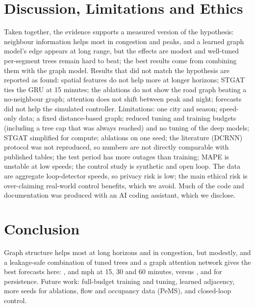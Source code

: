 \documentclass[conference]{IEEEtran}
\begin{document}
\section{Discussion, Limitations and Ethics}
Taken together, the evidence supports a measured version of the hypothesis: neighbour information helps most in congestion and peaks, and a learned graph model's edge appears at long range, but the effects are modest and well-tuned per-segment trees remain hard to beat; the best results come from combining them with the graph model.
Results that did not match the hypothesis are reported as found: spatial features do not help more at longer horizons; STGAT ties the GRU at 15 minutes; the ablations do not show the road graph beating a no-neighbour graph; attention does not shift between peak and night; forecasts did not help the simulated controller.
Limitations: one city and season; speed-only data; a fixed distance-based graph; reduced tuning and training budgets (including a tree cap that was always reached) and no tuning of the deep models; STGAT simplified for compute; ablations on one seed; the literature (DCRNN) protocol was not reproduced, so numbers are not directly comparable with published tables; the test period has more outages than training; MAPE is unstable at low speeds; the control study is synthetic and open loop.
The data are aggregate loop-detector speeds, so privacy risk is low; the main ethical risk is over-claiming real-world control benefits, which we avoid.
Much of the code and documentation was produced with an AI coding assistant, which we disclose.

\section{Conclusion}
Graph structure helps most at long horizons and in congestion, but modestly, and a leakage-safe combination of tuned trees and a graph attention network gives the best forecasts here: \maeHybridResidualFifteen{}, \maeHybridResidualThirty{} and \maeHybridGatingSixty{} mph at 15, 30 and 60 minutes, versus \maePersistenceFifteen{}, \maePersistenceThirty{} and \maePersistenceSixty{} for persistence.
Future work: full-budget training and tuning, learned adjacency, more seeds for ablations, flow and occupancy data (PeMS), and closed-loop control.



\end{document}
